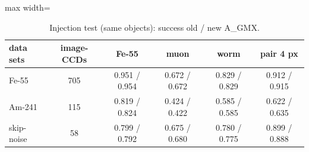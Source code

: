 \begin{table}[H]\centering\footnotesize
\begin{adjustbox}{max width=\linewidth}
\begin{tabular}{lccccc}
\toprule
data sets & image-CCDs & Fe-55 & muon & worm & pair 4 px \\
\midrule
Fe-55 & 705 & 0.951 / 0.954 & 0.672 / 0.672 & 0.829 / 0.829 & 0.912 / 0.915 \\
Am-241 & 115 & 0.819 / 0.824 & 0.424 / 0.422 & 0.585 / 0.585 & 0.622 / 0.635 \\
skip-noise & 58 & 0.799 / 0.792 & 0.675 / 0.680 & 0.780 / 0.775 & 0.899 / 0.888 \\
\bottomrule
\end{tabular}
\end{adjustbox}
\caption*{Injection test (same objects): success old / new A\_GMX.}
\end{table}
